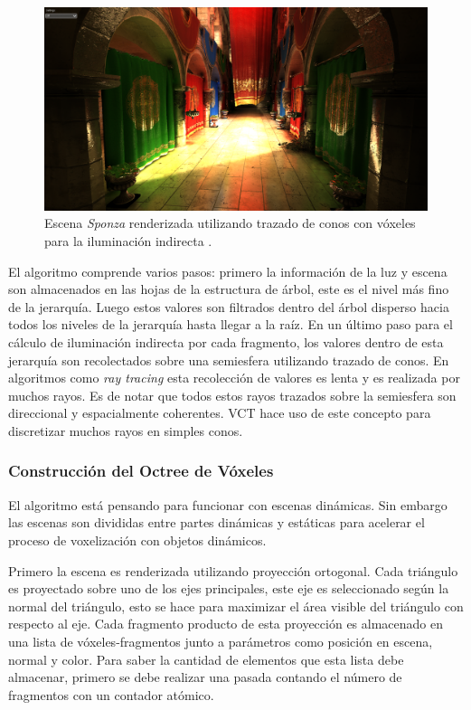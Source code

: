 \begin{figure}[H]
	\centering
	\includegraphics[width=0.9\linewidth]{media/givoxels_sponzanew1.png}
	\caption{Escena \emph{Sponza} renderizada utilizando trazado de conos con vóxeles para la iluminación indirecta \cite{CNSGE11b}.}
	\label{fig:givoxels_sponzanew1}
\end{figure}

El algoritmo comprende varios pasos: primero la información de la luz y escena son almacenados en las hojas de la estructura de árbol, este es el nivel más fino de la jerarquía. Luego estos valores son filtrados dentro del árbol disperso hacia todos los niveles de la jerarquía hasta llegar a la raíz. En un último paso para el cálculo de iluminación indirecta por cada fragmento, los valores dentro de esta jerarquía son recolectados sobre una semiesfera utilizando trazado de conos. En algoritmos como \emph{ray tracing} esta recolección de valores es lenta y es realizada por muchos rayos. Es de notar que todos estos rayos trazados sobre la semiesfera son direccional y espacialmente coherentes. \Ac{VCT} hace uso de este concepto para discretizar muchos rayos en simples conos.

\subsubsection{Construcción del Octree de Vóxeles}
\label{subsub:octree_building}
El algoritmo está pensando para funcionar con escenas dinámicas. Sin embargo las escenas son divididas entre partes dinámicas y estáticas para acelerar el proceso de voxelización con objetos dinámicos.

Primero la escena es renderizada utilizando proyección ortogonal. Cada triángulo es proyectado sobre uno de los ejes principales, este eje es seleccionado según la normal del triángulo, esto se hace para maximizar el área visible del triángulo con respecto al eje. Cada fragmento producto de esta proyección es almacenado en una lista de vóxeles-fragmentos junto a parámetros como posición en escena, normal y color. Para saber la cantidad de elementos que esta lista debe almacenar, primero se debe realizar una pasada contando el número de fragmentos con un contador atómico.


